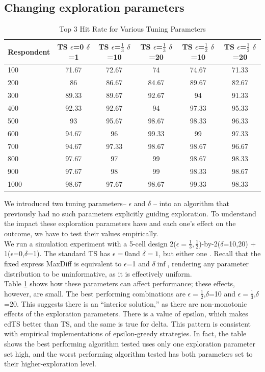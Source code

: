 \documentclass[mksc,blindrev]{informs3} %
\begin{document}
\subsection{Changing exploration parameters}
\begin{table}
\begin{center}
\begin{tabular}{l | c | c | c | c | c }
 Respondent& TS $\epsilon$=0 $\delta$=1&  TS $\epsilon$=$\frac{1}{3}$ $\delta$=10  &TS $\epsilon$=$\frac{1}{3}$ $\delta$=20 & TS $\epsilon$=$\frac{1}{2}$ $\delta$=10 &TS $\epsilon$=$\frac{1}{2}$ $\delta$=20  \\
\hline
100	&	71.67	&	72.67	&	74	&	74.67	&	71.33	\\
200	&	86	&	86.67	&	84.67	&	89.67	&	82.67	\\
300	&	89.33	&	89.67	&	92.67	&	94	&	91.33	\\
400	&	92.33	&	92.67	&	94	&	97.33	&	95.33	\\
500	&	93	&	95.67	&	98.67	&	98.33	&	96.33	\\
600	&	94.67	&	96	&	99.33	&	99	&	97.33	\\
700	&	94.67	&	97.33	&	98.67	&	98.67	&	96.67	\\
800	&	97.67	&	97	&	99	&	98.67	&	98.33	\\
900	&	97.67	&	98	&	99	&	98.33	&	98.67	\\
1000	&	98.67	&	97.67	&	98.67	&	99.33	&	98.33	\\
\hline
\end{tabular}
\end{center}
\caption{Top 3 Hit Rate for Various Tuning Parameters}
\label{table:EDTS}
\end{table}
We introduced two tuning parameters– $\epsilon$ and $\delta$ –  into an algorithm that previously had no such parameters explicitly guiding exploration. To understand the impact these exploration parameters have and each one’s effect on the outcome, we have to test their values empirically. \\
We run a simulation experiment with a 5-cell design 2($\epsilon=\frac{1}{3}, \frac{1}{2}$)-by-2($\delta$=10,20) + 1($\epsilon$=0,$\delta$=1).  The standard TS has $\epsilon=0$and $\delta=1$, but either one . Recall that the fixed express MaxDiff is equivalent to $\epsilon$=1 and $\delta\inf$, rendering any parameter distribution to be uninformative, as it is effectively uniform.\\
Table \ref{table:EDTS} shows how these parameters can affect performance; these effects, however, are small. The best performing combinations are $\epsilon=\frac{1}{2}$,$\delta$=10 and $\epsilon=\frac{1}{3}$,$\delta$=20. This suggests there is an “interior solution,” as there are non-monotonic effects of the exploration parameters. There is a value of epsilon, which makes edTS better than TS, and the same is true for delta. This pattern is consistent with empirical implementations of epsilon-greedy strategies. In fact, the table shows the best performing algorithm tested uses only one exploration parameter set high, and the worst performing algorithm tested has both parameters set to their higher-exploration level.\\
\end{document}
